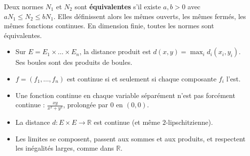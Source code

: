 \documentclass[11pt]{article}
\renewcommand{\leq}{\leqslant}\renewcommand{\geq}{\geqslant}
\newcommand{\R}{\mathbb{R}}
\begin{document}
Deux normes $N_1$ et $N_2$ sont \textbf{équivalentes} s'il existe $a,b>0$ avec $aN_1\leq N_2\leq bN_1$. Elles définissent alors les mêmes ouverts, les mêmes fermés, les mêmes fonctions continues. En dimension finie, toutes les normes sont équivalentes.


\begin{itemize}
\item Sur $E = E_1\times\dots\times E_n$, la distance produit est $d(x,y) = \max_i d_i(x_i,y_i)$. Ses boules sont des produits de boules.
\item $f = (f_1,\dots,f_n)$ est continue si et seulement si chaque composante $f_i$ l'est.
\item Une fonction continue en chaque variable séparément n'est pas forcément continue : $\frac{xy}{x^2+y^2}$, prolongée par $0$ en $(0,0)$.
\item La distance $d : E\times E\to\R$ est continue (et même $2$-lipschitzienne).
\item Les limites se composent, passent aux sommes et aux produits, et respectent les inégalités larges, comme dans $\R$.
\end{itemize}

\newpage
{}
\end{document}
